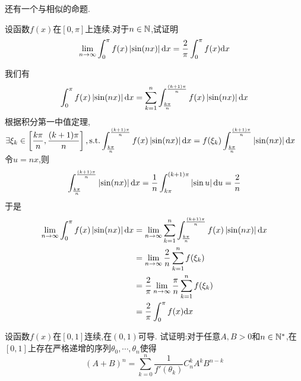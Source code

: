\documentclass{ctexart}
\begin{document}
还有一个与相似的命题.
\begin{problem}[Example 2.]
    设函数$f(x)$在$[0,\pi]$上连续.对于$n\in\mathbb{N}$,试证明$$\lim_{n\to\infty}\int_{0}^{\pi}f(x)\left|\sin(nx)\right|\mathrm{d} x=\dfrac{2}{\pi}\int_0^\pi f(x)\mathrm{d} x$$
\end{problem}
\begin{solution}[Proof.]
    我们有$$\int_0^\pi f(x)\left|\sin (nx)\right|\mathrm{d} x=\sum_{k=1}^{n}\int_{\frac{k\pi}{n}}^{\frac{(k+1)\pi}{n}}f(x)\left|\sin(nx)\right|\mathrm{d} x$$
    根据积分第一中值定理,$\displaystyle\exists\xi_k\in\left[\dfrac{k\pi}{n},\dfrac{(k+1)\pi}{n}\right],\text{s.t.}\int_{\frac{k\pi}{n}}^{\frac{(k+1)\pi}{n}}f(x)\left|\sin(nx)\right|\mathrm{d} x=f(\xi_k)\int_{\frac{k\pi}{n}}^{\frac{(k+1)\pi}{n}}\left|\sin(nx)\right|\mathrm{d} x$\\
    令$u=nx$,则$$\int_{\frac{k\pi}{n}}^{\frac{(k+1)\pi}{n}}\left|\sin(nx)\right|\mathrm{d} x=\dfrac{1}{n}\int_{k\pi}^{(k+1)\pi}\left|\sin u\right|\mathrm{d} u=\dfrac{2}{n}$$
    于是$$\begin{aligned}
        \lim_{n\to\infty}\int_0^\pi f(x)\left|\sin (nx)\right|\mathrm{d} x
        &= \lim_{n\to\infty}\sum_{k=1}^{n}\int_{\frac{k\pi}{n}}^{\frac{(k+1)\pi}{n}}f(x)\left|\sin(nx)\right|\mathrm{d} x \\
        &= \lim_{n\to\infty}\dfrac{2}{n}\sum_{k=1}^nf(\xi_k) \\
        &= \dfrac{2}{\pi}\lim_{n\to\infty}\dfrac{\pi}{n}\sum_{k=1}^{n}f(\xi_k) \\
        &= \dfrac{2}{\pi}\int_0^\pi f(x)\mathrm{d} x
    \end{aligned}$$
\end{solution}
\begin{problem}[Example 3.]
    设函数$f(x)$在$[0,1]$连续,在$(0,1)$可导.
    试证明:对于任意$A,B>0$和$n\in\mathbb{N}^*$,在$[0,1]$上存在严格递增的序列$\theta_0,\cdots,\theta_n$使得
    $$(A+B)^n=\sum_{k=0}^{n}\dfrac{1}{f'(\theta_k)}C^k_nA^kB^{n-k}$$
\end{problem}
\end{document}
